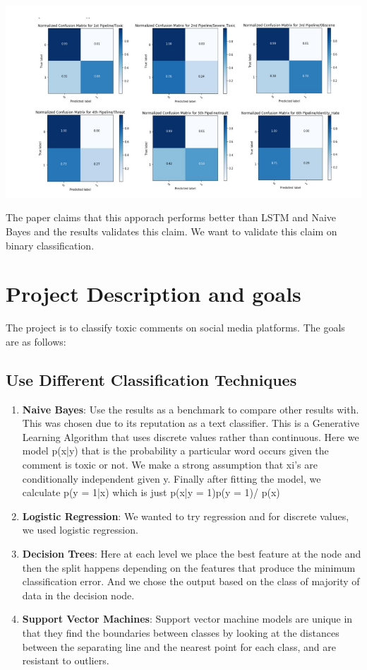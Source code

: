 \documentclass[11pt]{article}
\begin{document}
\includegraphics[scale=0.9]{figs/chakra_all.png}

The paper claims that this apporach performs better than
LSTM and Naive Bayes and the results validates this claim. 
We want to validate this claim on binary classification.
\section{Project Description and goals}
The project is to classify toxic comments on social media platforms. The goals are as follows:
\subsection*{Use Different Classification Techniques}
\begin{enumerate}
	\item \textbf{Naive Bayes}: Use the results as a benchmark to 
	compare other results with. This was chosen due to its reputation as a text classifier. This is a Generative Learning Algorithm that uses discrete values rather than continuous. Here we model p(x|y) that is the probability a particular word occurs given the comment is toxic or not. We make a strong assumption that xi's are conditionally independent given y. Finally after fitting the model, we calculate
	p(y = 1|x) which is just p(x|y = 1)p(y = 1)/ p(x)
	
	\item \textbf{Logistic Regression}: We wanted to try regression and for discrete values, we used logistic regression.
	\item \textbf{Decision Trees}: Here at each level we place the best feature at the node and then the split happens  depending on the features that produce the minimum classification error. And we chose the output based on the class of majority of data in the decision node.

	\item \textbf{Support Vector Machines}: Support vector machine models are unique in that they find the boundaries between classes by looking at the distances between the separating line and the nearest point for each class, and are resistant to outliers. 

\end{enumerate}
\end{document}
